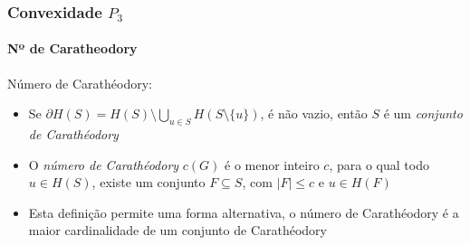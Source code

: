 \begin{frame}
\frametitle{Convexidade $P_3$}
\framesubtitle{Nº de Caratheodory}
Número de Carathéodory:
\begin{itemize}
\item{Se $\partial H(S)=H(S) \setminus \bigcup _{u \in S} H(S \setminus \{u\})$,
é não vazio, então $S$ é um \textit{conjunto de Carathéodory}}
\item{O \textit{número de Carathéodory} $c(G)$ é o menor inteiro $c$,
para o qual todo $u \in H(S)$, existe um conjunto $F \subseteq  S$,
com $|F| \le c$ e $u \in H(F)$}
\item{Esta definição permite uma  forma alternativa,
o número de Carathéodory é a maior cardinalidade de um conjunto de Carathéodory}
\end{itemize}
\end{frame}
